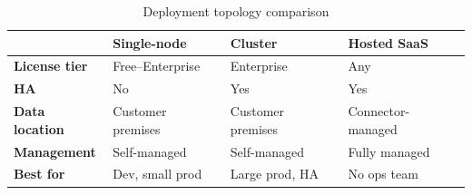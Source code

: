 \begin{table}[H]
\centering
\renewcommand{\arraystretch}{1.4}
\begin{tabularx}{\textwidth}{@{}lXXX@{}}
\toprule
 & \textbf{Single-node} & \textbf{Cluster} & \textbf{Hosted SaaS} \\
\midrule
\textbf{License tier}    & Free–Enterprise   & Enterprise       & Any \\
\textbf{HA}              & No                & Yes              & Yes \\
\textbf{Data location}   & Customer premises & Customer premises & Connector-managed \\
\textbf{Management}      & Self-managed      & Self-managed      & Fully managed \\
\textbf{Best for}        & Dev, small prod   & Large prod, HA    & No ops team \\
\bottomrule
\end{tabularx}
\caption{Deployment topology comparison}
\end{table}

